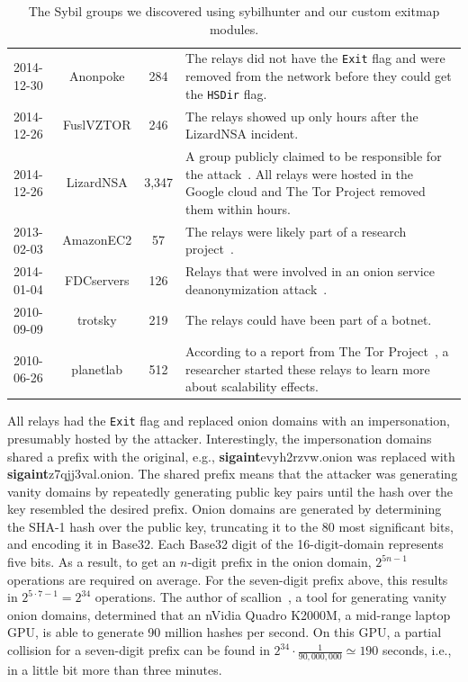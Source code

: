 \begin{table}[t]
\begin{tabular}{l c c p{10cm}}
2014-12-30 & Anonpoke & 284 & The relays did not have the \texttt{Exit} flag and
were removed from the network before they could get the \texttt{HSDir} flag. \\

2014-12-26 & FuslVZTOR & 246 & The relays showed up only hours after the
LizardNSA incident. \\

2014-12-26 & LizardNSA & 3,347 & A group publicly claimed to be responsible for
the attack~\cite{lizards}.  All relays were hosted in the Google cloud and The
Tor Project removed them within hours. \\

2013-02-03 & AmazonEC2 & 57 & The relays were likely part of a research
project~\cite{Biryukov2013a}. \\

2014-01-04 & FDCservers & 126 & Relays that were involved in an onion service
deanonymization attack~\cite{cmucert}. \\

2010-09-09 & trotsky & 219 & The relays could have been part of a botnet. \\

2010-06-26 & planetlab & 512 & According to a report from The Tor
Project~\cite{progressreport}, a researcher started these relays to learn more
about scalability effects. \\
\end{tabular}
\caption{The Sybil groups we discovered using sybilhunter and our custom exitmap
modules.}
\label{tab:sybils}
\end{table}

All relays had the \texttt{Exit} flag and replaced onion domains with an
impersonation, presumably hosted by the attacker.  Interestingly, the
impersonation domains shared a prefix with the original, e.g.,
\textbf{sigaint}evyh2rzvw.onion was replaced with
\textbf{sigaint}z7qjj3val.onion.  The shared prefix means that the attacker was
generating vanity domains by repeatedly generating public key pairs until the
hash over the key resembled the desired prefix.  Onion domains are generated by
determining the SHA-1 hash over the public key, truncating it to the 80 most
significant bits, and encoding it in Base32.  Each Base32 digit of the
16-digit-domain represents five bits.  As a result, to get an $n$-digit prefix
in the onion domain, $2^{5 n - 1}$ operations are required on average.  For the
seven-digit prefix above, this results in $2^{5 \cdot 7 - 1} = 2^{34}$
operations.  The author of scallion~\cite{scallion}, a tool for generating
vanity onion domains, determined that an nVidia Quadro K2000M, a mid-range
laptop GPU, is able to generate 90 million hashes per second.  On this GPU, a
partial collision for a seven-digit prefix can be found in $2^{34} \cdot
\frac{1}{90,000,000} \simeq 190$ seconds, i.e., in a little bit more than three
minutes.

